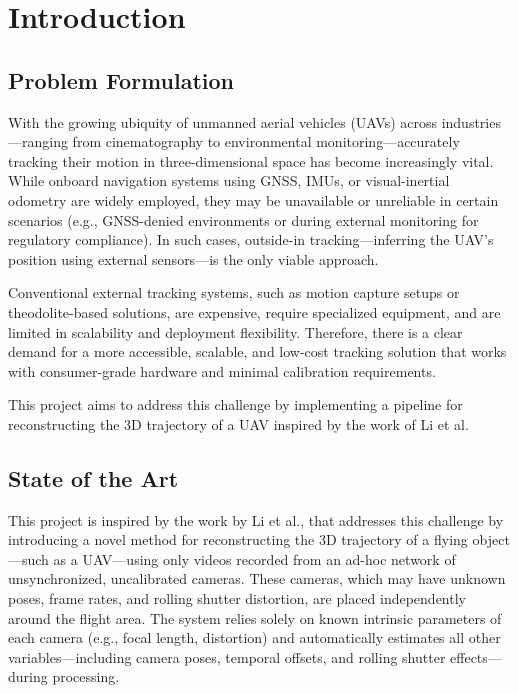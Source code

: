 \documentclass[11pt]{article}
\begin{document}
\tableofcontents

\section{Introduction}

\subsection{Problem Formulation}
With the growing ubiquity of unmanned aerial vehicles (UAVs) across industries—ranging from cinematography to environmental monitoring—accurately tracking their motion in three-dimensional space has become increasingly vital. While onboard navigation systems using GNSS, IMUs, or visual-inertial odometry are widely employed, they may be unavailable or unreliable in certain scenarios (e.g., GNSS-denied environments or during external monitoring for regulatory compliance). In such cases, outside-in tracking—inferring the UAV's position using external sensors—is the only viable approach.

Conventional external tracking systems, such as motion capture setups or theodolite-based solutions, are expensive, require specialized equipment, and are limited in scalability and deployment flexibility. Therefore, there is a clear demand for a more accessible, scalable, and low-cost tracking solution that works with consumer-grade hardware and minimal calibration requirements.

This project aims to address this challenge by implementing a pipeline for reconstructing the 3D trajectory of a UAV inspired by the work of Li et al.

\subsection{State of the Art}
This project is inspired by the work by Li et al., that addresses this challenge by introducing a novel method for reconstructing the 3D trajectory of a flying object—such as a UAV—using only videos recorded from an ad-hoc network of unsynchronized, uncalibrated cameras. These cameras, which may have unknown poses, frame rates, and rolling shutter distortion, are placed independently around the flight area. The system relies solely on known intrinsic parameters of each camera (e.g., focal length, distortion) and automatically estimates all other variables—including camera poses, temporal offsets, and rolling shutter effects—during processing.
\end{document}
